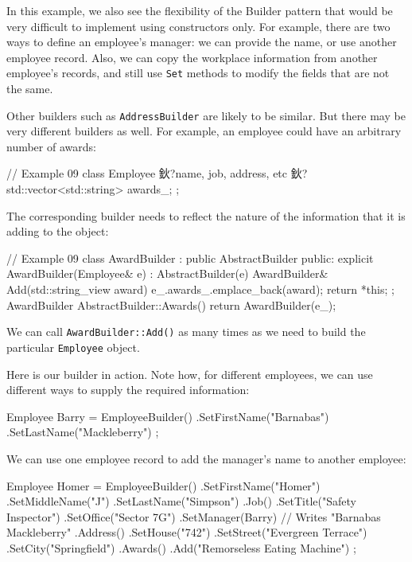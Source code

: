 In this example, we also see the flexibility of the Builder pattern that would be very difficult to implement using constructors only. For example, there are two ways to define an employee's manager: we can provide the name, or use another employee record. Also, we can copy the workplace information from another employee's records, and still use \texttt{Set} methods to modify the fields that are not the same.

Other builders such as \texttt{AddressBuilder} are likely to be similar. But there may be very different builders as well. For example, an employee could have an arbitrary number of awards:

\begin{code}
// Example 09
class Employee {
  鈥?name, job, address, etc 鈥?
  std::vector<std::string> awards_;
};
\end{code}

The corresponding builder needs to reflect the nature of the information that it is adding to the object:

\begin{code}
// Example 09
class AwardBuilder : public AbstractBuilder {
  public:
  explicit AwardBuilder(Employee& e) : AbstractBuilder(e)
  {}
  AwardBuilder& Add(std::string_view award) {
    e_.awards_.emplace_back(award); return *this;
  }
};
AwardBuilder AbstractBuilder::Awards() {
  return AwardBuilder(e_);
}
\end{code}

We can call \texttt{AwardBuilder::Add()} as many times as we need to build the particular \texttt{Employee} object.

Here is our builder in action. Note how, for different employees, we can use different ways to supply the required information:

\begin{code}
Employee Barry = EmployeeBuilder()
  .SetFirstName("Barnabas")
  .SetLastName("Mackleberry")
;
\end{code}

We can use one employee record to add the manager's name to another employee:

\begin{code}
Employee Homer = EmployeeBuilder()
  .SetFirstName("Homer")
  .SetMiddleName("J")
  .SetLastName("Simpson")
  .Job()
    .SetTitle("Safety Inspector")
    .SetOffice("Sector 7G")
    .SetManager(Barry) // Writes "Barnabas Mackleberry"
  .Address()
    .SetHouse("742")
    .SetStreet("Evergreen Terrace")
    .SetCity("Springfield")
  .Awards()
    .Add("Remorseless Eating Machine")
;
\end{code}

